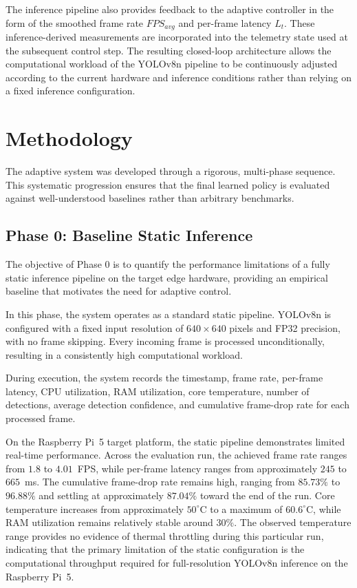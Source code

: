 \documentclass{ieeeaccess}
\begin{document}
The inference pipeline also provides feedback to the adaptive controller in
the form of the smoothed frame rate $FPS_{avg}$ and per-frame latency $L_t$.
These inference-derived measurements are incorporated into the telemetry
state used at the subsequent control step. The resulting closed-loop
architecture allows the computational workload of the YOLOv8n pipeline to be
continuously adjusted according to the current hardware and inference
conditions rather than relying on a fixed inference configuration.

\section{Methodology}

\label{sec:methodology}

The adaptive system was developed through a rigorous, multi-phase sequence.
This systematic progression ensures that the final learned policy is
evaluated against well-understood baselines rather than arbitrary
benchmarks.

\subsection{Phase 0: Baseline Static Inference}

The objective of Phase 0 is to quantify the performance limitations of a
fully static inference pipeline on the target edge hardware, providing an
empirical baseline that motivates the need for adaptive control.

In this phase, the system operates as a standard static pipeline. YOLOv8n is
configured with a fixed input resolution of $640 \times 640$ pixels and FP32
precision, with no frame skipping. Every incoming frame is processed
unconditionally, resulting in a consistently high computational workload.

During execution, the system records the timestamp, frame rate, per-frame
latency, CPU utilization, RAM utilization, core temperature, number of
detections, average detection confidence, and cumulative frame-drop rate for
each processed frame.

On the Raspberry Pi~5 target platform, the static pipeline demonstrates
limited real-time performance. Across the evaluation run, the achieved frame
rate ranges from $1.8$ to $4.01$~FPS, while per-frame latency ranges from
approximately $245$ to $665$~ms. The cumulative frame-drop rate remains high,
ranging from $85.73\%$ to $96.88\%$ and settling at approximately $87.04\%$
toward the end of the run. Core temperature increases from approximately
$50^\circ$C to a maximum of $60.6^\circ$C, while RAM utilization remains
relatively stable around $30\%$. The observed temperature range provides no
evidence of thermal throttling during this particular run, indicating that
the primary limitation of the static configuration is the computational
throughput required for full-resolution YOLOv8n inference on the Raspberry
Pi~5.
\end{document}
